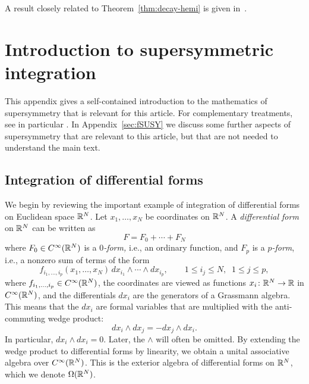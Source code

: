 \documentclass[11pt,a4paper]{article}
\begin{document}
\begin{remark}
  \label{rem:exp-dec-mcb}
  A result closely related to Theorem~\ref{thm:decay-hemi} is given
  in~\cite[Theorem~2]{MR0441179}.
\end{remark}


\appendix

\section{Introduction to supersymmetric integration}
\label{sec:SUSY-intro}

This appendix gives a self-contained introduction to the mathematics
of supersymmetry that is relevant for this article.  For complementary
treatments, see in particular \cite{MR914369,MR1843511,MR2525670}.  In
Appendix~\ref{sec:fSUSY} we discuss some further aspects of
supersymmetry that are relevant to this article, but that are not
needed to understand the main text.


\subsection{Integration of differential forms}
\label{sec:IDF}

We begin by reviewing the important example of integration of
differential forms on Euclidean space $\mathbb{R}^N$. Let $x_{1},\dots, x_{N}$
be coordinates on $\mathbb{R}^{N}$.  A \emph{differential form} on $\mathbb{R}^N$ can
be written as
\begin{equation}
  \label{eq:F-exp}
  F = F_0 + \cdots + F_N
\end{equation}
where $F_0 \in C^\infty(\mathbb{R}^N)$ is a \emph{$0$-form,} i.e., an ordinary
function, and $F_p$ is a \emph{$p$-form}, i.e., a nonzero sum of terms of the form
\begin{equation}
  f_{i_{1},\dots, i_{p}}(x_1,\dots, x_N) \, dx_{i_1} \wedge \cdots \wedge
  dx_{i_p}, \qquad 1\leq i_{j}\leq N, \;\; 1\leq j\leq p,
\end{equation}
where $f_{i_{1},\dots, i_{p}} \in C^\infty(\mathbb{R}^N)$,
the coordinates are viewed as functions $x_i\colon \mathbb{R}^N \to \mathbb{R}$ in $C^\infty(\mathbb{R}^N)$,
and the differentials $dx_i$
are the generators of a Grassmann algebra. 
This means that the $dx_{i}$ are formal variables that are
multiplied with the anti-commuting wedge product:
\begin{equation} \label{e:dx-anti}
  dx_i \wedge dx_j = -dx_j \wedge dx_i.
\end{equation}
In particular, $dx_i \wedge dx_i = 0$.
Later, the $\wedge$ will often be omitted. By extending the wedge
product to differential forms by linearity, we obtain a unital
associative algebra over $C^{\infty}(\mathbb{R}^{N})$. This is the exterior algebra
of differential forms on $\mathbb{R}^N$, which we denote $\Omega(\mathbb{R}^N)$.
\end{document}
